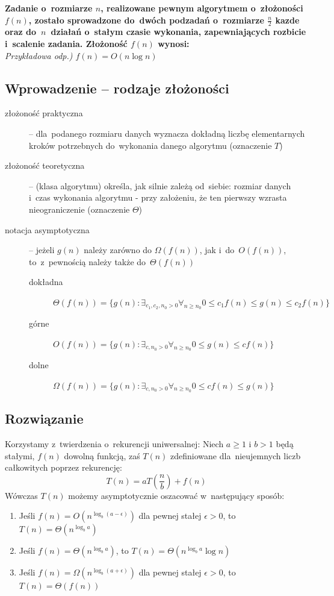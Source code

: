 \textbf{Zadanie o~rozmiarze $n$, realizowane pewnym algorytmem o~złożoności $f(n)$, zostało sprowadzone do~dwóch podzadań o~rozmiarze $\frac{n}{2}$ kazde oraz do~$n$~działań o~stałym czasie wykonania, zapewniających rozbicie i~scalenie zadania. Złożoność $f(n)$ wynosi:}\\
\textit{Przykładowa odp.) $f(n) = O(n\log{n})$}

\vspace{0.4cm}
\subsection{Wprowadzenie -- rodzaje złożoności}
\begin{description}
 \item[złożoność praktyczna] -- dla~podanego rozmiaru danych wyznacza dokładną liczbę elementarnych kroków potrzebnych do~wykonania danego algorytmu (oznaczenie \textbf{$T$})
 \item[złożoność teoretyczna] -- (klasa algorytmu) określa, jak silnie zależą od~siebie: rozmiar danych i~czas wykonania algorytmu - przy założeniu, że ten pierwszy wzrasta nieograniczenie (oznaczenie \textbf{$\Theta$})
 \item[notacja asymptotyczna] -- jeżeli $g(n)$ należy zarówno do $\Omega(f(n))$, jak i~do~$O(f(n))$, to~z~pewnością należy także do~$\Theta(f(n))$ 
 \begin{description}
  \item[dokładna] $ \Theta (f(n)) = \{ g(n): \exists_{c_1, c_2,n_0 > 0} \forall_{n \ge n_0} 0 \le c_1 f(n) \le g(n) \le c_2 f(n)  \} $
  \item[górne] $ O(f(n)) = \{ g(n): \exists_{c,n_0 > 0} \forall_{n \ge n_0} 0 \le g(n) \le c f(n)  \} $
  \item[dolne]$ \Omega (f(n)) = \{ g(n): \exists_{c,n_0 > 0} \forall_{n \ge n_0} 0 \le  c f(n) \le g(n) \} $
 \end{description}
\end{description}
 \subsection{Rozwiązanie}
 Korzystamy z~twierdzenia o~rekurencji uniwersalnej:
 Niech $a \ge 1$ i $b > 1$ będą stałymi, $f(n)$ dowolną funkcją, zaś $T(n)$ zdefiniowane dla~nieujemnych liczb całkowitych poprzez rekurencję:
$$T(n) = aT(\frac{n}{b}) + f(n)$$
Wówczas $T(n)$ możemy asymptotycznie oszacować w~następujący sposób:
\begin{enumerate}
 \item Jeśli $f(n) = O(n^{\log_b {(a -\epsilon)}})$ dla pewnej stałej $\epsilon > 0$, to $T(n) = \Theta(n^{\log_b a})$
 \item Jeśli $f(n) = \Theta(n^{\log_b {a}})$, to $T(n) = \Theta(n^{\log_b a} \log n)$
 \item Jeśli $f(n) = \Omega(n^{\log_b {(a + \epsilon)}})$ dla pewnej stałej $\epsilon > 0$, to $T(n) = \Theta(f(n))$
\end{enumerate}

